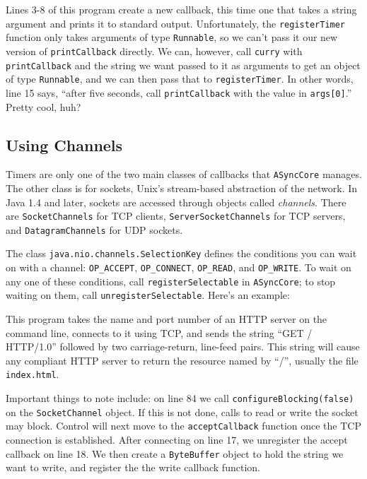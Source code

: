 \documentclass[11pt]{article}
\begin{document}
Lines 3-8 of this program create a new callback, this time one that takes a
string argument and prints it to standard output.  
Unfortunately, the \texttt{registerTimer} function only takes arguments of
type \texttt{Runnable}, so we can't pass it our new version of
\texttt{printCallback} directly.  We can, however, call \texttt{curry}
with \texttt{printCallback} and the string we want passed to it as
arguments to get an object of type \texttt{Runnable}, and we can then
pass that to \texttt{registerTimer}.
In other words, line 15 says, ``after
five seconds, call \texttt{printCallback} with the value in
\texttt{args[0]}.''  Pretty cool, huh?

\subsection{Using Channels}

Timers are only one of the two main classes of callbacks that
\texttt{ASyncCore} manages.  The other class is for sockets, Unix's
stream-based abstraction of the network.  In Java 1.4 and later, sockets
are accessed through objects called \emph{channels}.  There are
\texttt{SocketChannels} for TCP clients, \texttt{ServerSocketChannels}
for TCP servers, and \texttt{DatagramChannels} for UDP sockets.  

The class \texttt{java.nio.channels.SelectionKey} defines the conditions you
can wait on with a channel: \texttt{OP\_ACCEPT}, \texttt{OP\_CONNECT},
\texttt{OP\_READ}, and \texttt{OP\_WRITE}.  To wait on any one of these
conditions, call \texttt{registerSelectable} in \texttt{ASyncCore}; to
stop waiting on them, call \texttt{unregisterSelectable}.  Here's an
example:

\begin{quote}
\lstset{language=Java, basicstyle=\small, numbers=left, numberstyle=\tiny, 
        numberfirstline=true, stepnumber=1, numbersep=5pt}

\end{quote}

This program takes the name and port number of an HTTP server on the command
line, connects to it using TCP, and sends the string ``GET / HTTP/1.0''
followed by two carriage-return, line-feed pairs.  This string will cause any
compliant HTTP server to return the resource named by ``/'', usually the file
\texttt{index.html}.

Important things to note include: on line 84 we call
\texttt{configureBlocking(false)} on the \texttt{SocketChannel} object.  If
this is not done, calls to read or write the socket may block.  
Control will next move to the \texttt{acceptCallback} function once the TCP
connection is established.  After
connecting on line 17, we unregister the accept callback on line 18.  We then
create a \texttt{ByteBuffer} object to hold the string we want to write, and
register the the write callback function.
\end{document}
